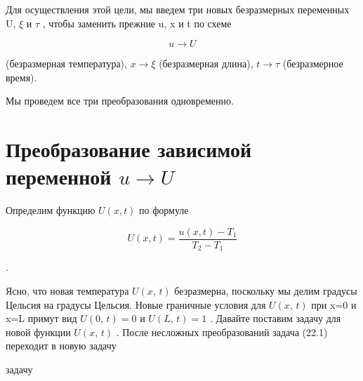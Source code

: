 \documentclass[
  ukrainian,
]{article}
\begin{document}
Для осуществления этой цели, мы введем три новых безразмерных переменных
U, \(\xi\) и \(\tau\) , чтобы заменить прежние u, x и t по схеме

\[
u \to U
\]

(безразмерная температура), \(x \to \xi\) (безразмерная длина),
\(t \to \tau\) (безразмерное время).

Мы проведем все три преобразования одновременно.

\section{\texorpdfstring{Преобразование зависимой переменной
\(u \rightarrow U\)}{Преобразование зависимой переменной u \textbackslash rightarrow U}}\label{ux43fux440ux435ux43eux431ux440ux430ux437ux43eux432ux430ux43dux438ux435-ux437ux430ux432ux438ux441ux438ux43cux43eux439-ux43fux435ux440ux435ux43cux435ux43dux43dux43eux439-u-rightarrow-u}

Определим функцию \(U(x, t)\) по формуле

\[
U(x, t) = \frac{u(x, t) - T_1}{T_2 - T_1}
\]

.

Ясно, что новая температура \(U\left(x,\,t\right)\) безразмерна,
поскольку мы делим градусы Цельсия на градусы Цельсия. Новые граничные
условия для \(U\left(x,\,t\right)\) при x=0 и x=L примут вид
\(U\left(0,\,t\right)=0\) и \(U\left(L,\,t\right)=1\) . Давайте поставим
задачу для новой функции \(U\left(x,\,t\right)\) . После несложных
преобразований задача (22.1) переходит в новую задачу

задачу
\end{document}
